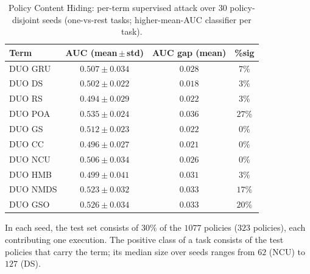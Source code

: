 \begin{table}[htbp]
	\centering
	\caption{Policy Content Hiding: per-term supervised attack over 30 policy-disjoint
		seeds (one-vs-rest tasks; higher-mean-AUC classifier per task).}
	\label{tab:pch-terms}
	\begin{tabular}{lccc}
		\toprule
		Term     & AUC (mean\,$\pm$\,std) & AUC gap (mean) & \%sig  \\
		\midrule
		DUO GRU  & $0.507 \pm 0.034$      & $0.028$        & $7\%$ \\
		DUO DS   & $0.502 \pm 0.022$      & $0.018$        & $3\%$ \\
		DUO RS   & $0.494 \pm 0.029$      & $0.022$        & $3\%$ \\
		DUO POA  & $0.535 \pm 0.024$      & $0.036$        & $27\%$ \\
		DUO GS   & $0.512 \pm 0.023$      & $0.022$        & $0\%$ \\
		DUO CC   & $0.496 \pm 0.027$      & $0.021$        & $0\%$ \\
		DUO NCU  & $0.506 \pm 0.034$      & $0.026$        & $0\%$ \\
		DUO HMB  & $0.499 \pm 0.041$      & $0.031$        & $3\%$ \\
		DUO NMDS & $0.523 \pm 0.032$      & $0.033$        & $17\%$ \\
		DUO GSO  & $0.526 \pm 0.034$      & $0.033$        & $20\%$ \\
		\bottomrule
	\end{tabular}
	\begin{tablenote}
		In each seed, the test set consists of $30\%$ of the $1077$ policies ($323$ policies), each contributing one execution. The positive class of a task consists of the test policies that carry the term; its median size over seeds ranges from $62$ (NCU) to $127$ (DS).
	\end{tablenote}
\end{table}

